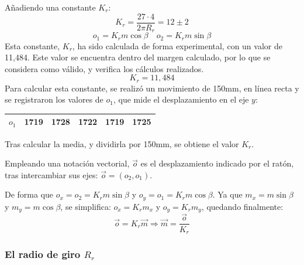 \documentclass[10pt,a4paper,hidelinks,twocolumn,nobalancelastpage]{article}
\begin{document}
Añadiendo una constante $K_r$:
$$K_r = \frac{27\cdot4}{2 \pi R_r} = 12\pm2$$
$$ o_1 = K_r m \cos \beta \quad
	o_2 = K_r m \sin \beta $$
Esta constante, $K_r$, ha sido calculada de forma experimental, con un valor de 
11,484. Este valor se encuentra dentro del margen calculado, por lo que se 
considera como válido, y verifica los cálculos realizados.
$$K_r = 11,484$$
Para calcular esta constante, se realizó un movimiento de 150mm, en línea recta 
y se registraron los valores de $o_1$, que mide el desplazamiento en el eje $y$:

\begin{center}
\begin{tabular}{ | c | c | c | c | c | c |}
\hline
$o_1$ & 1719 & 1728 & 1722 & 1719 & 1725 \\ \hline
\end{tabular}
\end{center}

Tras calcular la media, y dividirla por 150mm, se obtiene el valor $K_r$.

Empleando una notación vectorial, $\vec{o}$ es el desplazamiento indicado por el 
ratón, tras intercambiar sus ejes: $\vec{o} = (o_2, o_1)$.

De forma que $o_x = o_2 = K_r m \sin \beta$ y $o_y = o_1 = K_r m \cos \beta$. Ya 
que $m_x = m \sin \beta$ y $m_y = m \cos \beta$, se simplifica: $o_x = K_r m_x$ 
y $o_y = K_r m_y$, quedando finalmente:
\begin{equation}
	\vec{o} = K_r \vec{m} \Longrightarrow \vec{m} = \frac{\vec{o}}{K_r}
	\label{eq:o}
\end{equation}
\subsubsection{El radio de giro $R_r$}
\end{document}
